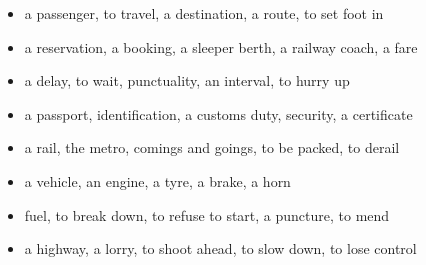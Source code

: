 \begin{itemize}
\raggedright
  \item a passenger, to travel, a destination, a route, to set foot in
  \item a reservation, a booking, a sleeper berth, a railway coach, a fare
  \item a delay, to wait, punctuality, an interval, to hurry up
  \item a passport, identification, a customs duty, security, a certificate
  \item a rail, the metro, comings and goings, to be packed, to derail
  \item a vehicle, an engine, a tyre, a brake, a horn
  \item fuel, to break down, to refuse to start, a puncture, to mend
  \item a highway, a lorry, to shoot ahead, to slow down, to lose control
\end{itemize}

